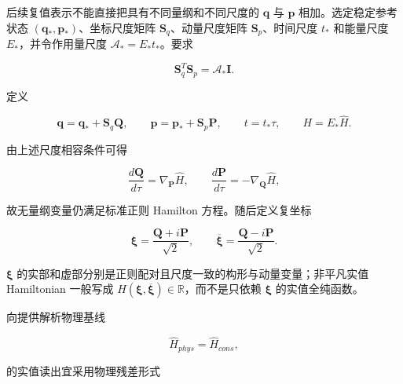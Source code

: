 后续复值表示不能直接把具有不同量纲和不同尺度的 \(\mathbf{q}\) 与 \(\mathbf{p}\) 相加。选定稳定参考状态 \(\left( \mathbf{q}_{*},\mathbf{p}_{*} \right)\)、坐标尺度矩阵 \(\mathbf{S}_{q}\)、动量尺度矩阵 \(\mathbf{S}_{p}\)、时间尺度 \(t_{*}\) 和能量尺度 \(E_{*}\)，并令作用量尺度 \(\mathcal{A}_{*} = E_{*}t_{*}\)。要求

\begin{equation}
\label{eq:hamiltonian-3-65}
\boxed{\mathbf{S}_{q}^{T}\mathbf{S}_{p} = \mathcal{A}_{*}\mathbf{I}.}
\end{equation}

定义

\begin{equation}
\label{eq:hamiltonian-3-66}
\mathbf{q} = \mathbf{q}_{*} + \mathbf{S}_{q}\mathbf{Q},\quad\quad\mathbf{p} = \mathbf{p}_{*} + \mathbf{S}_{p}\mathbf{P},\quad\quad t = t_{*}\tau,\quad\quad H = E_{*}\widehat{H}.
\end{equation}

由上述尺度相容条件可得

\begin{equation}
\label{eq:hamiltonian-3-67}
\frac{d\mathbf{Q}}{d\tau} = \nabla_{\mathbf{P}}\widehat{H},\quad\quad\frac{d\mathbf{P}}{d\tau} = - \nabla_{\mathbf{Q}}\widehat{H},
\end{equation}

故无量纲变量仍满足标准正则 Hamilton 方程。随后定义复坐标\cite{MarsdenRatiu1999MechanicsSymmetry,Arnold1989ClassicalMechanics}

\begin{equation}
\label{eq:hamiltonian-3-68}
\boxed{\bm{\xi} = \frac{\mathbf{Q} + i\mathbf{P}}{\sqrt{2}},\quad\quad\overline{\bm{\xi}} = \frac{\mathbf{Q} - i\mathbf{P}}{\sqrt{2}}.}
\end{equation}

\(\bm{\xi}\) 的实部和虚部分别是正则配对且尺度一致的构形与动量变量；非平凡实值 Hamiltonian 一般写成 \(\widehat{H}\left( \bm{\xi},\overline{\bm{\xi}} \right) \in \mathbb{R}\)，而不是只依赖 \(\bm{\xi}\) 的实值全纯函数\cite{Trabelsi2018DeepComplex,Hirose2012CVNN}。

向提供解析物理基线

\begin{equation}
\label{eq:hamiltonian-3-69}
{\widehat{H}}_{phys} = {\widehat{H}}_{cons},
\end{equation}

的实值读出宜采用物理残差形式

